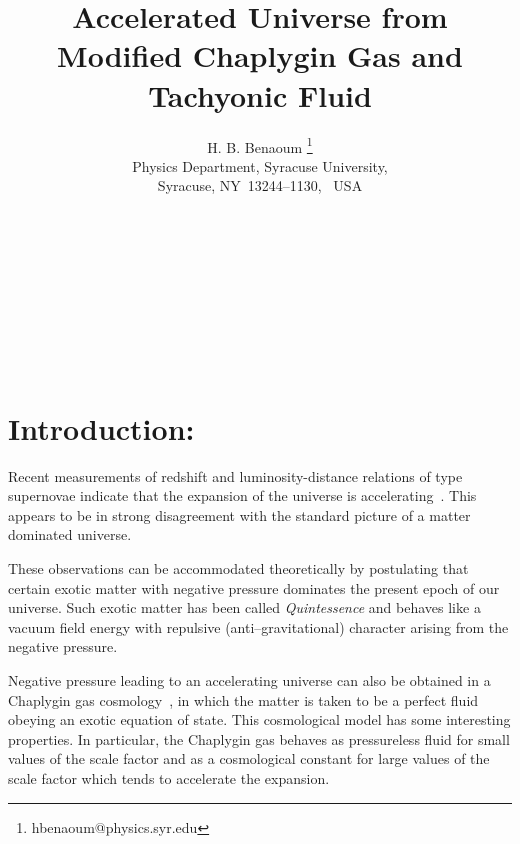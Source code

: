 \documentclass[a4paper,12pt,a4]{article}
\begin{document}
 
\title{\bf Accelerated Universe from   
Modified Chaplygin Gas and Tachyonic Fluid   
} 
\author{ H. B. Benaoum \footnote{hbenaoum@physics.syr.edu}
  \\
Physics Department, Syracuse University, \\
Syracuse, NY~13244--1130,~ USA }
\date{}
\maketitle
~\\
~\\ 
~\\
~\\
~\\
\newpage
~\\  
\section{Introduction:}  

Recent measurements of redshift and luminosity-distance relations of 
type \coordHE{} supernovae indicate that the expansion of
the universe is accelerating~\cite{per, rie}. This appears to be in 
strong disagreement with the standard picture of a matter dominated 
universe.  
 
These observations can be accommodated theoretically by postulating  
that certain exotic matter with negative pressure dominates  
the present epoch of our universe. Such exotic matter has been called 
{\em Quintessence} and behaves like a vacuum field energy with repulsive 
(anti--gravitational) character arising from the negative pressure. 

Negative pressure leading to an accelerating universe can also 
be obtained in a Chaplygin gas cosmology~\cite{pas},
in which the matter is taken to be a perfect fluid 
obeying an exotic equation of state. This cosmological model has some 
interesting properties. In particular, the Chaplygin gas behaves as 
pressureless fluid for small values of the scale factor and as a 
cosmological constant for large values of the scale factor which tends to 
accelerate the expansion.  
 
\end{document}
